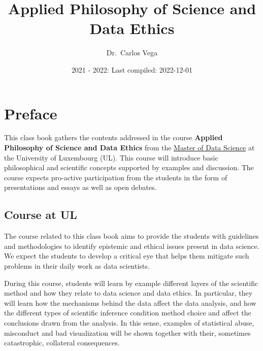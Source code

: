 \documentclass[
]{book}
\title{Applied Philosophy of Science and Data Ethics}
\author{Dr.~Carlos Vega}
\date{2021 - 2022: Last compiled: 2022-12-01}
\let\oldmaketitle\maketitle
\begin{document}
\maketitle

\thispagestyle{empty}


\let\maketitle\oldmaketitle
\maketitle

{
\hypersetup{linkcolor=}
\setcounter{tocdepth}{3}
\tableofcontents
}
\hypertarget{preface}{%
\chapter*{Preface}\label{preface}}

This class book gathers the contents addressed in the course \textbf{Applied Philosophy of Science and Data Ethics} from the \href{https://wwwfr.uni.lu/formations/fstm/master_of_data_science}{Master of Data Science} at the University of Luxembourg (UL). This course will introduce basic philosophical and scientific concepts supported by examples and discussion. The course expects pro-active participation from the students in the form of presentations and essays as well as open debates.

\hypertarget{course-at-ul}{%
\section*{Course at UL}\label{course-at-ul}}

The course related to this class book aims to provide the students with guidelines and methodologies to identify epistemic and ethical issues present in data science. We expect the students to develop a critical eye that helps them mitigate such problems in their daily work as data scientists.

During this course, students will learn by example different layers of the scientific method and how they relate to data science and data ethics. In particular, they will learn how the mechanisms behind the data affect the data analysis, and how the different types of scientific inference condition method choice and affect the conclusions drawn from the analysis. In this sense, examples of statistical abuse, misconduct and bad visualization will be shown together with their, sometimes catastrophic, collateral consequences.
\end{document}
